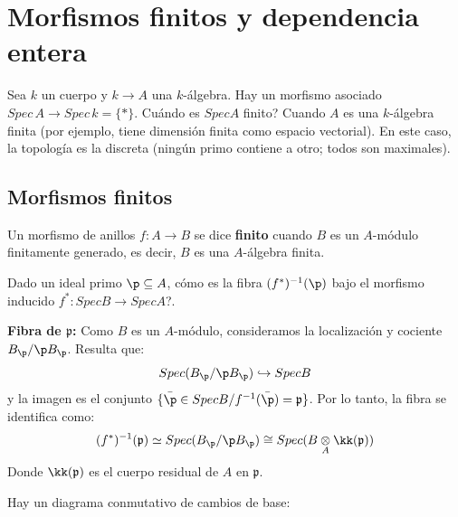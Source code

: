  
\chapter{Morfismos finitos y dependencia entera}\justifying 

Sea $k$ un cuerpo y $k \to A$ una $k$-álgebra. Hay un morfismo asociado $Spec\, A \longrightarrow Spec\,  k = \{ * \}$. 
\textquestiondown Cuándo es $Spec A$ finito? Cuando $A$ es una $k$-álgebra finita (por ejemplo, tiene dimensión finita como espacio vectorial). En este caso, la topología es la discreta (ningún primo contiene a otro; todos son maximales).
\section{Morfismos finitos}
\begin{defi}
    Un morfismo de anillos $f: A \to B$ se dice \textbf{finito} cuando $B$ es un $A$-módulo finitamente generado, es decir, $B$ es una $A$-\'algebra finita. 
\end{defi}
Dado un ideal primo $\p \subseteq A$, \textquestiondown cómo es la fibra $(f^*)^{-1}(\p)$ bajo el morfismo inducido $f^*: Spec B \to Spec A$?.

\noindent \textbf{Fibra de $\mathfrak{p}$:} Como $B$ es un $A$-módulo, consideramos la localización y cociente $B_{\p} / \p B_{\p}$. Resulta que:
$$Spec(B_{\p} / \p B_{\p}) \hookrightarrow Spec B$$
y la imagen es el conjunto $\{\bar \p \in Spec B / f^{-1}(\bar \p) = \mathfrak{p}\}$. Por lo tanto, la fibra se identifica como:
$$(f^*)^{-1}(\mathfrak{p}) \simeq Spec(B_{\p} / \p B_{\p}) \cong Spec(B \underset{A}{\otimes}\kk (\mathfrak{p})) \text{}$$
Donde $\kk (\mathfrak{p})$ es el cuerpo residual de $A$ en $\mathfrak{p}$.

Hay un diagrama conmutativo de cambios de base:
\begin{center}
\end{center}

